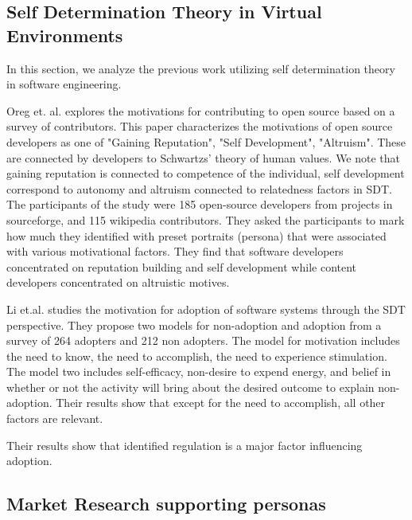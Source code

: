 \documentclass[conference]{IEEEtran}
\begin{document}

\subsection{Self Determination Theory in Virtual Environments}
In this section, we analyze the previous work utilizing self determination theory in software engineering.

Oreg et. al. explores the motivations for contributing to open source based on a survey of contributors\cite{oreg2008exploring}.
This paper characterizes the motivations of open source developers as one of "Gaining Reputation", "Self Development", "Altruism".
These are connected by developers to Schwartzs' theory of human values.
We note that gaining reputation is connected to competence of the individual, self development correspond to autonomy and altruism
connected to relatedness factors in SDT. The participants of the study were 185 open-source developers from projects in sourceforge,
and 115 wikipedia contributors. They asked the participants to mark how much they identified with preset portraits (persona) that
were associated with various motivational factors.
They find that software developers concentrated on reputation building and self development while content developers concentrated
on altruistic motives.

Li et.al.\cite{yan2011opensource} studies the motivation for adoption of software systems through the SDT perspective.
They propose two models for non-adoption and adoption from a survey of 264 adopters and 212 non adopters. The model for motivation
includes the need to know, the need to accomplish, the need to experience stimulation.
The model two includes self-efficacy, non-desire to expend energy, and belief in whether or not the activity will bring about the
desired outcome to explain non-adoption. Their results show that except for the need to accomplish, all other factors are relevant.

Their results show that identified
regulation is a major factor influencing adoption.


\subsection{Market Research supporting personas}
\end{document}
